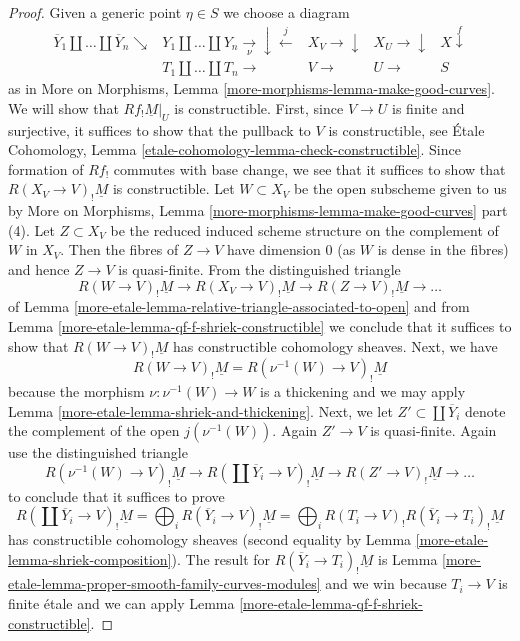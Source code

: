 \begin{proof}
\medskip\noindent
Given a generic point $\eta \in S$ we choose a diagram
$$
\begin{array}{ccccc}\overline{Y}_1 \amalg \ldots \amalg \overline{Y}_n \searrow & Y_1 \amalg \ldots \amalg Y_n \underset{\nu}{\longrightarrow}\downarrow\overset{j}{\longleftarrow} & X_V \longrightarrow\downarrow & X_U \longrightarrow\downarrow & X \overset{f}{\downarrow} \\  & T_1 \amalg \ldots \amalg T_n \longrightarrow & V \longrightarrow & U \longrightarrow & S\end{array}
$$
as in More on Morphisms, Lemma \ref{more-morphisms-lemma-make-good-curves}.
We will show that $Rf_!\underline{M}|_U$ is constructible.
First, since $V \to U$ is finite and surjective, it suffices
to show that the pullback to $V$ is constructible, see
\'Etale Cohomology, Lemma \ref{etale-cohomology-lemma-check-constructible}.
Since formation of $Rf_!$ commutes with base change, we
see that it suffices to show that
$R(X_V \to V)_!\underline{M}$ is constructible.
Let $W \subset X_V$ be the open subscheme given to us by
More on Morphisms, Lemma \ref{more-morphisms-lemma-make-good-curves} part (4).
Let $Z \subset X_V$ be the reduced induced scheme structure on
the complement of $W$ in $X_V$. Then the fibres of $Z \to V$
have dimension $0$ (as $W$ is dense in the fibres) and hence
$Z \to V$ is quasi-finite. From the distinguished triangle
$$
R(W \to V)_!\underline{M} \to
R(X_V \to V)_!\underline{M} \to
R(Z \to V)_!\underline{M} \to
\ldots
$$
of Lemma \ref{more-etale-lemma-relative-triangle-associated-to-open} and
from Lemma \ref{more-etale-lemma-qf-f-shriek-constructible}
we conclude that it suffices to show that
$R(W \to V)_!\underline{M}$ has constructible cohomology sheaves.
Next, we have
$$
R(W \to V)_!\underline{M} = R(\nu^{-1}(W) \to V)_!\underline{M}
$$
because the morphism $\nu : \nu^{-1}(W) \to W$ is a thickening
and we may apply Lemma \ref{more-etale-lemma-shriek-and-thickening}.
Next, we let $Z' \subset \coprod \overline{Y}_i$ denote the
complement of the open $j(\nu^{-1}(W))$. Again $Z' \to V$ is quasi-finite.
Again use the distinguished triangle
$$
R(\nu^{-1}(W) \to V)_!\underline{M} \to
R(\coprod \overline{Y}_i \to V)_!\underline{M} \to
R(Z' \to V)_!\underline{M} \to
\ldots
$$
to conclude that it suffices to prove
$$
R(\coprod \overline{Y}_i \to V)_!\underline{M} =
\bigoplus\nolimits_i R(\overline{Y}_i \to V)_!\underline{M} =
\bigoplus\nolimits_i R(T_i \to V)_!R(\overline{Y}_i \to T_i)_!\underline{M}
$$
has constructible cohomology sheaves (second equality by
Lemma \ref{more-etale-lemma-shriek-composition}).
The result for $R(\overline{Y}_i \to T_i)_!\underline{M}$
is Lemma \ref{more-etale-lemma-proper-smooth-family-curves-modules}
and we win because $T_i \to V$ is finite \'etale
and we can apply Lemma \ref{more-etale-lemma-qf-f-shriek-constructible}.
\end{proof}

